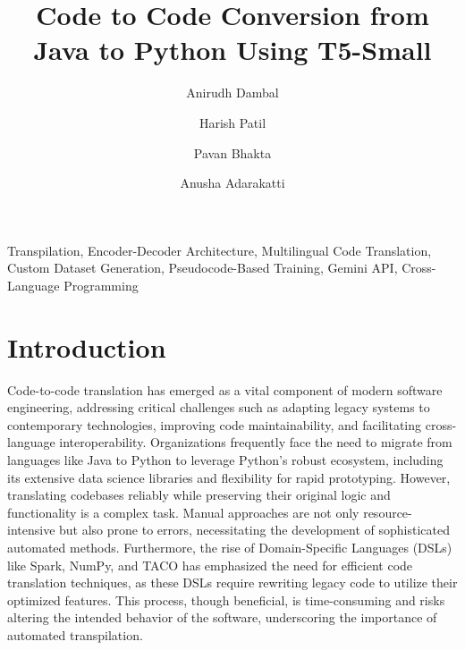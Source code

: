 \documentclass{dhbenelux}
\author[1]{Anirudh Dambal}
\author[1]{Harish Patil}
\author[1]{Pavan Bhakta}
\author[1]{Anusha Adarakatti}
\affil{School of Computer Science and Engineering,
KLE Technological University, Hubballi, Karnataka, India, 580031}
\title{Code to Code Conversion from Java to Python
Using T5-Small}
\begin{document}
\maketitle
\begin{abstract}
\end{abstract}

\begin{keywords}
    {Transpilation, Encoder-Decoder Architecture, Multilingual Code Translation, Custom Dataset Generation, Pseudocode-Based Training, Gemini API, Cross-Language Programming}
\end{keywords}

\section{Introduction}

Code-to-code translation has emerged as a vital component of modern software engineering, addressing critical challenges such as adapting legacy systems to contemporary technologies, improving code maintainability, and facilitating cross-language interoperability. Organizations frequently face the need to migrate from languages like Java to Python to leverage Python’s robust ecosystem, including its extensive data science libraries and flexibility for rapid prototyping. However, translating codebases reliably while preserving their original logic and functionality is a complex task. Manual approaches are not only resource-intensive but also prone to errors, necessitating the development of sophisticated automated methods. Furthermore, the rise of Domain-Specific Languages (DSLs) like Spark, NumPy, and TACO has emphasized the need for efficient code translation techniques, as these DSLs require rewriting legacy code to utilize their optimized features. This process, though beneficial, is time-consuming and risks altering the intended behavior of the software, underscoring the importance of automated transpilation.
\end{document}
